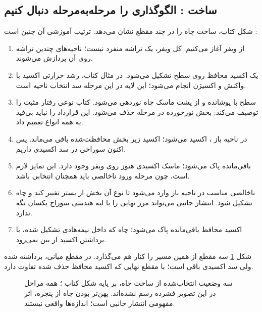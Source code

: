\subsection{ساخت : الگوگذاری را مرحله‌به‌مرحله دنبال کنیم}
شکل  کتاب، ساخت چاه را در چند مقطع نشان می‌دهد. ترتیب آموزشی آن چنین است
\cite[صفحات چاپی ۲۱ تا ۲۳]{weste}:
\begin{enumerate}
\item از ویفر  آغاز می‌کنیم. کل ویفر، یک تراشه منفرد نیست؛
ناحیه‌های چندین تراشه روی آن پردازش می‌شوند.
\item یک اکسید محافظ روی سطح تشکیل می‌شود. در مثال کتاب، رشد حرارتی اکسید
با واکنش  و اکسیژن انجام می‌شود؛ این لایه در این مرحله سد انتخاب ناحیه است.
\item سطح با  پوشانده و از پشت ماسک چاه نوردهی می‌شود.
کتاب نوعی رفتار مثبت را توصیف می‌کند: بخش نورخورده در مرحله  حذف می‌شود.
این قرارداد را نباید بی‌قید به همه انواع  تعمیم داد.
\item در ناحیه باز ، اکسید  می‌شود؛ اکسید زیر بخش
محافظت‌شده باقی می‌ماند. پس اکنون سوراخی در سد اکسیدی داریم.
\item {} باقی‌مانده پاک می‌شود؛ ماسک اکسیدی هنوز روی ویفر وجود دارد.
این تمایز لازم است، چون مرحله ورود ناخالصی باید همچنان انتخابی باشد.
\item ناخالصی مناسب  در ناحیه باز وارد می‌شود تا نوع آن بخش
از بستر تغییر کند و چاه تشکیل شود. انتشار جانبی می‌تواند مرز نهایی را
با لبه هندسی سوراخ یکسان نگه ندارد.
\item اکسید محافظ باقی‌مانده پاک می‌شود؛ چاه که داخل نیمه‌هادی تشکیل شده،
با برداشتن اکسید از بین نمی‌رود.
\end{enumerate}

شکل \ref{fig:layout-well-stages} سه مقطع از همین مسیر را کنار هم می‌گذارد.
در مقطع میانی،  برداشته شده ولی سد اکسیدی باقی است؛
با مقطع نهایی که اکسید محافظ حذف شده تفاوت دارد.
\begin{figure}[ht]
\centering
\begin{latin}
\end{latin}
\caption{سه وضعیت انتخاب‌شده از ساخت چاه، بر پایه شکل  کتاب
\cite{weste}؛ همه مراحل  در این تصویر فشرده رسم نشده‌اند.
پهن‌تر بودن چاه از پنجره، اثر مفهومی انتشار جانبی است؛ اندازه‌ها واقعی نیستند.}
\label{fig:layout-well-stages}
\end{figure}

